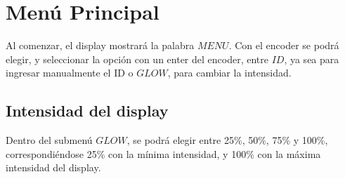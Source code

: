 \section{Menú Principal}

Al comenzar, el display mostrará la palabra $MENU$. Con el encoder se podrá elegir, y seleccionar la opción con un enter del encoder, entre $ID$, ya sea para ingresar manualmente el ID o $GLOW$, para cambiar la intensidad.

\subsection{Intensidad del display}

Dentro del submenú $GLOW$, se podrá elegir entre 25\%, 50\%, 75\% y 100\%, correspondiéndose 25\% con la mínima intensidad, y 100\% con la máxima intensidad del display.

\
